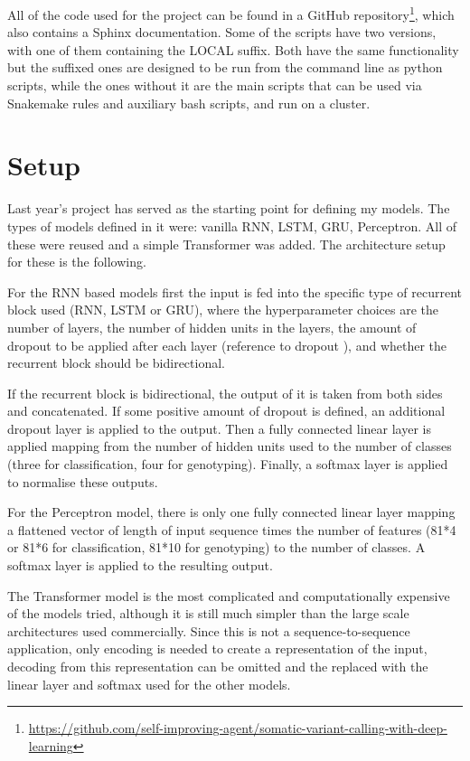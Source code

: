 \documentclass[bsc,frontabs,singlespacing,parskip,deptreport]{infthesis}
\begin{document}
All of the code used for the project can be found in a GitHub repository\footnote{\url{https://github.com/self-improving-agent/somatic-variant-calling-with-deep-learning}}, which also contains a Sphinx documentation. Some of the scripts have two versions, with one of them containing the LOCAL suffix. Both have the same functionality but the suffixed ones are designed to be run from the command line as python scripts, while the ones without it are the main scripts that can be used via Snakemake rules and auxiliary bash scripts, and run on a cluster. 

\section{Setup}

Last year's project has served as the starting point for defining my models. The types of models defined in it were: vanilla RNN, LSTM, GRU, Perceptron. All of these were reused and a simple Transformer was added. The architecture setup for these is the following.

For the RNN based models first the input is fed into the specific type of recurrent block used (RNN, LSTM or GRU), where the hyperparameter choices are the number of layers, the number of hidden units in the layers, the amount of dropout to be applied after each layer (reference to dropout \cite{dropout}), and whether the recurrent block should be bidirectional. 

If the recurrent block is bidirectional, the output of it is taken from both sides and concatenated. If some positive amount of dropout is defined, an additional dropout layer is applied to the output. Then a fully connected linear layer is applied mapping from the number of hidden units used to the number of classes (three for classification, four for genotyping). Finally, a softmax layer is applied to normalise these outputs.

For the Perceptron model, there is only one fully connected linear layer mapping a flattened vector of length of input sequence times the number of features (81*4 or 81*6 for classification, 81*10 for genotyping) to the number of classes. A softmax layer is applied to the resulting output.

The Transformer model is the most complicated and computationally expensive of the models tried, although it is still much simpler than the large scale architectures used commercially. Since this is not a sequence-to-sequence application, only encoding is needed to create a representation of the input, decoding from this representation can be omitted and the replaced with the linear layer and softmax used for the other models.
\end{document}
